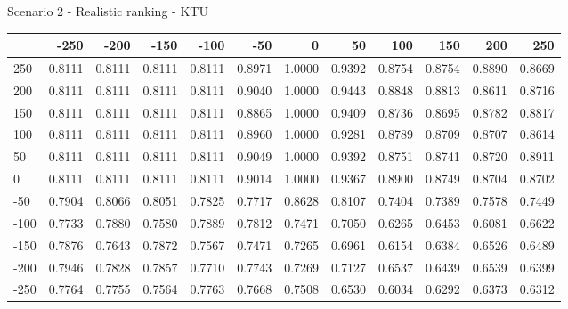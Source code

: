 Scenario 2 - Realistic ranking - KTU
\begin{tabular}{lrrrrrrrrrrr}
\toprule
{} &   -250 &   -200 &   -150 &   -100 &   -50  &    0   &    50  &    100 &    150 &    200 &    250 \\
\midrule
 250 & 0.8111 & 0.8111 & 0.8111 & 0.8111 & 0.8971 & 1.0000 & 0.9392 & 0.8754 & 0.8754 & 0.8890 & 0.8669 \\
 200 & 0.8111 & 0.8111 & 0.8111 & 0.8111 & 0.9040 & 1.0000 & 0.9443 & 0.8848 & 0.8813 & 0.8611 & 0.8716 \\
 150 & 0.8111 & 0.8111 & 0.8111 & 0.8111 & 0.8865 & 1.0000 & 0.9409 & 0.8736 & 0.8695 & 0.8782 & 0.8817 \\
 100 & 0.8111 & 0.8111 & 0.8111 & 0.8111 & 0.8960 & 1.0000 & 0.9281 & 0.8789 & 0.8709 & 0.8707 & 0.8614 \\
 50  & 0.8111 & 0.8111 & 0.8111 & 0.8111 & 0.9049 & 1.0000 & 0.9392 & 0.8751 & 0.8741 & 0.8720 & 0.8911 \\
 0   & 0.8111 & 0.8111 & 0.8111 & 0.8111 & 0.9014 & 1.0000 & 0.9367 & 0.8900 & 0.8749 & 0.8704 & 0.8702 \\
-50  & 0.7904 & 0.8066 & 0.8051 & 0.7825 & 0.7717 & 0.8628 & 0.8107 & 0.7404 & 0.7389 & 0.7578 & 0.7449 \\
-100 & 0.7733 & 0.7880 & 0.7580 & 0.7889 & 0.7812 & 0.7471 & 0.7050 & 0.6265 & 0.6453 & 0.6081 & 0.6622 \\
-150 & 0.7876 & 0.7643 & 0.7872 & 0.7567 & 0.7471 & 0.7265 & 0.6961 & 0.6154 & 0.6384 & 0.6526 & 0.6489 \\
-200 & 0.7946 & 0.7828 & 0.7857 & 0.7710 & 0.7743 & 0.7269 & 0.7127 & 0.6537 & 0.6439 & 0.6539 & 0.6399 \\
-250 & 0.7764 & 0.7755 & 0.7564 & 0.7763 & 0.7668 & 0.7508 & 0.6530 & 0.6034 & 0.6292 & 0.6373 & 0.6312 \\
\bottomrule
\end{tabular}


